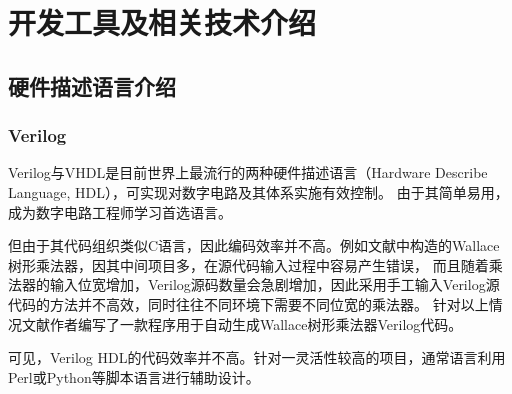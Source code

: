 \chapter{开发工具及相关技术介绍}

\section{硬件描述语言介绍}
    \subsection{Verilog}
        Verilog与VHDL是目前世界上最流行的两种硬件描述语言（Hardware Describe Language, HDL），可实现对数字电路及其体系实施有效控制。
        由于其简单易用，成为数字电路工程师学习首选语言。

        但由于其代码组织类似C语言，因此编码效率并不高。例如文献\cite{deng2018wallace}中构造的Wallace树形乘法器，因其中间项目多，在源代码输入过程中容易产生错误，
        而且随着乘法器的输入位宽增加，Verilog源码数量会急剧增加，因此采用手工输入Verilog源代码的方法并不高效，同时往往不同环境下需要不同位宽的乘法器。
        针对以上情况文献\cite{deng2018wallace}作者编写了一款程序用于自动生成Wallace树形乘法器Verilog代码。

        可见，Verilog HDL的代码效率并不高。针对一灵活性较高的项目，通常语言利用Perl或Python等脚本语言进行辅助设计。


